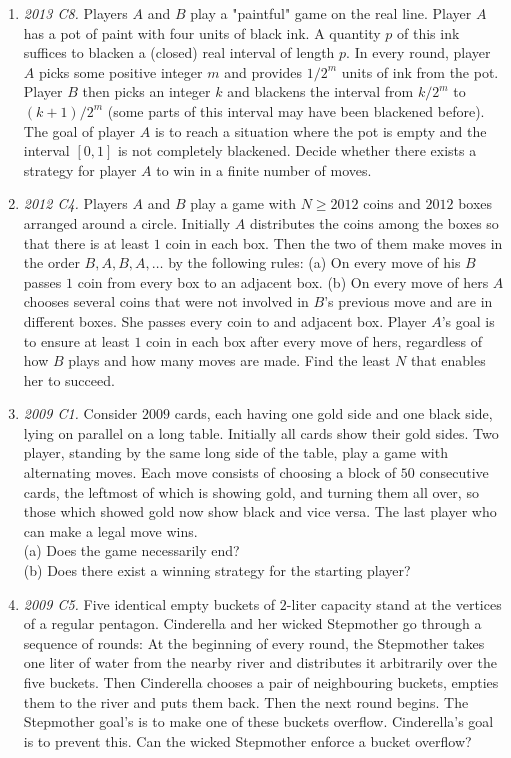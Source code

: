 \documentclass[11pt,a4paper]{article}
\begin{document}
\begin{enumerate}
\item\emph {2013 C8.} Players $A$ and $B$ play a "paintful" game on the real line. Player $A$ has a pot of paint with four units of black ink. A quantity $p$ of this ink suffices to blacken a (closed) real interval of length $p$. In every round, player $A$ picks some positive integer $m$ and provides $1/2^m $ units of ink from the pot. Player $B$ then picks an integer $k$ and blackens the interval from $k/2^m$ to $(k+1)/2^m$ (some parts of this interval may have been blackened before). The goal of player $A$ is to reach a situation where the pot is empty and the interval $[0,1]$ is not completely blackened.
Decide whether there exists a strategy for player $A$ to win in a finite number of moves.

\item\emph {2012 C4.} Players $A$ and $B$ play a game with $N \geq 2012$ coins and $2012$ boxes arranged around a circle. Initially $A$ distributes the coins among the boxes so that there is at least $1$ coin in each box. Then the two of them make moves in the order $B,A,B,A,\ldots $ by the following rules:
(a) On every move of his $B$ passes $1$ coin from every box to an adjacent box.
(b) On every move of hers $A$ chooses several coins that were not involved in $B$'s previous move and are in different boxes. She passes every coin to and adjacent box.
Player $A$'s goal is to ensure at least $1$ coin in each box after every move of hers, regardless of how $B$ plays and how many moves are made. Find the least $N$ that enables her to succeed.

\item\emph {2009 C1.} Consider $2009$ cards, each having one gold side and one black side, lying on parallel on a long table. Initially all cards show their gold sides. Two player, standing by the same long side of the table, play a game with alternating moves. Each move consists of choosing a block of $50$ consecutive cards, the leftmost of which is showing gold, and turning them all over, so those which showed gold now show black and vice versa. The last player who can make a legal move wins.\\
(a) Does the game necessarily end?\\
(b) Does there exist a winning strategy for the starting player?

\item\emph {2009 C5.} Five identical empty buckets of $2$-liter capacity stand at the vertices of a regular pentagon. Cinderella and her wicked Stepmother go through a sequence of rounds: At the beginning of every round, the Stepmother takes one liter of water from the nearby river and distributes it arbitrarily over the five buckets. Then Cinderella chooses a pair of neighbouring buckets, empties them to the river and puts them back. Then the next round begins. The Stepmother goal's is to make one of these buckets overflow. Cinderella's goal is to prevent this. Can the wicked Stepmother enforce a bucket overflow?
\end{enumerate}
\end{document}
